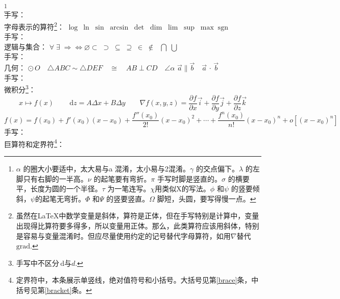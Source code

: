 \documentclass[11pt, a4paper, titlepage]{article}
\newcommand{\diff}{\,\mathrm{d}} %
\begin{document}
\begin{enumerate}
    \footnote{$\alpha$ 的圈大小要适中，太大易与a 混淆，太小易与2混淆。$\gamma$ 的交点偏下。$\lambda$ 的左脚只有右脚的一半高。$\nu$ 的起笔要有弯折。$\pi$ 手写时脚是竖直的。$\sigma$ 的横要平，长度为圆的一个半径。$\tau$ 为一笔连写。$\chi$用类似X的写法。$\phi$ 和$\psi$ 的竖要倾斜，$\psi$的起笔无弯折。$\Phi$ 和$\Psi$ 的竖要竖直。$\Omega$ 脚短，头圆，要写得慢一点。}\\
    手写：\\[7pt]
    字母表示的算符\footnote{虽然在\LaTeX 中数学变量是斜体，算符是正体，但在手写特别是计算中，变量出现得比算符要多得多，所以变量用正体。那么，此类算符应该用斜体，特别是容易与变量混淆时。但应尽量使用约定的记号替代字母算符，如用$\nabla$替代$\mathrm{grad}$.}：
    {\fontsize{13pt}{1}
    $\log\: \ln\; \sin\; \arcsin\; \det\; \dim\; \lim\; \sup\; \max\; \mathrm{sgn}$\\}
    手写：\\[7pt]
    逻辑与集合：
    {\fontsize{13pt}{1}
    $\forall \; \exists \; \Rightarrow \iff \varnothing \subset \; \supset \; \subseteq \; \supseteq \; \in \; \notin \;$} $\bigcap \; \bigcup$\\%
    手写：\\[7pt]
    几何：
    {\fontsize{10pt}{1}
    $\odot\,O \quad \triangle ABC\!\sim\!\triangle DEF \quad \cong \quad AB\!\perp CD\!\quad \angle\alpha$} \quad $\vec{a}\parallel\vec{b} \quad \vec{a}\,\cdot\,\vec{b}$ \\
    手写：\\[7pt]
    微积分\footnote{手写中不区分$\diff$与$d$.}：
    \begin{displaymath}
        x \mapsto f(x) \qquad \diff z = A\Delta x + B\Delta y \qquad
        \nabla f(x, y, z) = \frac{\partial f}{\partial x}\vec{i} + \frac{\partial f}{\partial y}\vec{j} + \frac{\partial f}{\partial z}\vec{k}
    \end{displaymath}
    \begin{displaymath}
        f(x) = f(x_{0}) + f'(x_{0})(x - x_{0}) + \frac{f''(x_{0})}{2!}(x - x_{0})^{2} + \cdots + \frac{f^{n}(x_{0})}{n!}(x - x_{0})^{n} + o[(x - x_{0})^{n}]
    \end{displaymath}
    手写：\\[60pt]
    巨算符和定界符\footnote{定界符中，本条展示单竖线，绝对值符号和小括号。大括号见第\ref{brace}条，中括号见第\ref{bracket}条。}：
    \begin{displaymath}

\end{displaymath}
\end{enumerate}
\end{document}

